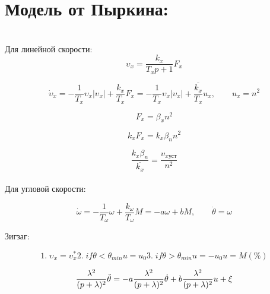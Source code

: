 \newpage

\section*{Модель от Пыркина:} \\

Для линейной скорости:
\begin{equation*}
\upsilon_x = \frac{k_x}{T_xp + 1}F_x
\end{equation*} 

\begin{equation*}
\Dot{\upsilon}_x = -\frac{1}{T_x}\upsilon_x|\upsilon_x| + \frac{k_x}{T_x}F_x = -\frac{1}{T_x}\upsilon_x|\upsilon_x| + \frac{\overline{k_x}}{T_x}u_x, \qquad u_x = n^2
\end{equation*}

\begin{equation*}
F_x = \beta_xn^2
\end{equation*} 

\begin{equation*}
k_xF_x = k_x\beta_nn^2
\end{equation*} 

\begin{equation*}
\frac{k_x\beta_n}{\overline{k_x}} = \frac{\upsilon_{x \text{уст}}}{n^2}
\end{equation*} \\

Для угловой скорости:

\begin{equation*}
\Dot{\omega} = -\frac{1}{T_\omega}\omega + \frac{k_\omega}{T_\omega}M = -a\omega + bM, \qquad \Dot{\theta} = \omega
\end{equation*}

Зигзаг: \\

\begin{left}
\begin{equation*}
1. \; \upsilon_x = \upsilon_x^* 

2. \; if \theta < \theta_{min} 

u = u_0 

3. \; if \theta > \theta_{min} 

u = -u_0

u = M(\%)
\end{equation*} 
\end{left}


\begin{equation*}
\frac{\lambda^2}{(p+\lambda)^2}\Ddot{\theta} = -a\frac{\lambda^2}{(p+\lambda)^2}\Dot{\theta} + b\frac{\lambda^2}{(p+\lambda)^2}u + \xi
\end{equation*}

